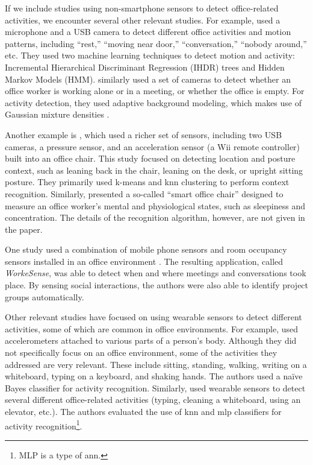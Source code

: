 If we include studies using non-smartphone sensors to detect office-related activities, we encounter several other relevant studies. For example, \cite{huang2004office} %
used a microphone and a USB %
camera to detect different office activities and motion patterns, including ``rest,'' ``moving near door,'' ``conversation,'' ``nobody around,'' etc. They used two machine learning techniques to detect motion and activity: Incremental Hierarchical Discriminant Regression (IHDR) trees and Hidden Markov Models (HMM). \cite{danninger2008context} similarly used a set of cameras to detect whether an office worker is working alone or in a meeting, or whether the office is empty. For activity detection, they used adaptive background modeling, which makes use of Gaussian mixture densities \cite{stauffer1999adaptive}.

Another example is \cite{manabe2010perceptual}, which used a richer set of sensors, including two USB cameras, a pressure sensor, and an acceleration sensor (a Wii remote controller) built into an office chair. This study focused on detecting location and posture context, such as leaning back in the chair, leaning on the desk, or upright sitting posture. They primarily used k-means and \gls{knn} %
clustering to perform context recognition. Similarly, \cite{kiyokawa2012owens} %
presented a so-called ``smart office chair'' designed to measure an office worker's mental and physiological states, such as sleepiness and concentration. The details of the recognition algorithm, however, are not given in the paper.

One study used a combination of mobile phone sensors and room occupancy sensors installed in an office environment \cite{rachuri2014smartphone}. The resulting application, called \emph{WorkeSense}, was able to detect when and where meetings and conversations took place. By sensing social interactions, the authors were also able to identify project groups automatically.

Other relevant studies have focused on using wearable sensors to detect different activities, some of which are common in office environments. For example, \cite{kern2003multi} %
used accelerometers attached to various parts of a person's body. Although they did not specifically focus on an office environment, some of the activities they addressed are very relevant. These include sitting, standing, walking, writing on a whiteboard, typing on a keyboard, and shaking hands. The authors used a na\"{i}ve Bayes classifier for activity recognition. Similarly, \cite{pirttikangas2006feature} used wearable sensors to detect several different office-related activities (typing, cleaning a whiteboard, using an elevator, etc.). The authors evaluated the use of \gls{knn} and \gls{mlp} classifiers for activity recognition\footnote{MLP is a type of \gls{ann}.}.


